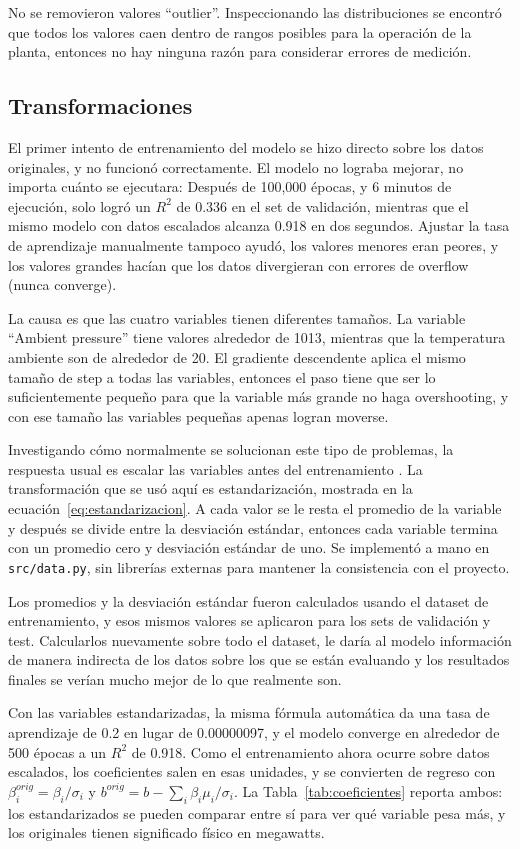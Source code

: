 \documentclass[conference]{IEEEtran}
\begin{document}
No se removieron valores ``outlier''. Inspeccionando las distribuciones se encontró que todos los valores caen dentro de rangos posibles para la operación de la planta, entonces no hay ninguna razón para considerar errores de medición.
\subsection{Transformaciones}
\label{sec:transformaciones}
El primer intento de entrenamiento del modelo se hizo directo sobre los datos originales, y no funcionó correctamente. El modelo no lograba mejorar, no importa cuánto se ejecutara: Después de 100,000 épocas, y 6 minutos de ejecución, solo logró un $R^2$ de 0.336 en el set de validación, mientras que el mismo modelo con datos escalados alcanza 0.918 en dos segundos. Ajustar la tasa de aprendizaje manualmente tampoco ayudó, los valores menores eran peores, y los valores grandes hacían que los datos divergieran con errores de overflow (nunca converge).

La causa es que las cuatro variables tienen diferentes tamaños. La variable ``Ambient pressure'' tiene valores alrededor de 1013, mientras que la temperatura ambiente son de alrededor de 20. El gradiente descendente aplica el mismo tamaño de step a todas las variables, entonces el paso tiene que ser lo suficientemente pequeño para que la variable más grande no haga overshooting, y con ese tamaño las variables pequeñas apenas logran moverse.

Investigando cómo normalmente se solucionan este tipo de problemas, la respuesta usual es escalar las variables antes del entrenamiento \cite{b1}. La transformación que se usó aquí es estandarización, mostrada en la ecuación~\ref{eq:estandarizacion}. A cada valor se le resta el promedio de la variable y después se divide entre la desviación estándar, entonces cada variable termina con un promedio cero y desviación estándar de uno. Se implementó a mano en \texttt{src/data.py}, sin librerías externas para mantener la consistencia con el proyecto.

Los promedios y la desviación estándar fueron calculados usando el dataset de entrenamiento, y esos mismos valores se aplicaron para los sets de validación y test. Calcularlos nuevamente sobre todo el dataset, le daría al modelo información de manera indirecta de los datos sobre los que se están evaluando y los resultados finales se verían mucho mejor de lo que realmente son.

Con las variables estandarizadas, la misma fórmula automática da una tasa de aprendizaje de 0.2 en lugar de 0.00000097, y el modelo converge en alrededor de 500 épocas a un $R^2$ de 0.918. Como el entrenamiento ahora ocurre sobre datos escalados, los coeficientes salen en esas unidades, y se convierten de regreso con $\beta_i^{orig} = \beta_i / \sigma_i$ y $b^{orig} = b - \sum_i \beta_i \mu_i / \sigma_i$. La Tabla~\ref{tab:coeficientes} reporta ambos: los estandarizados se pueden comparar entre sí para ver qué variable pesa más, y los originales tienen significado físico en megawatts.
\end{document}
